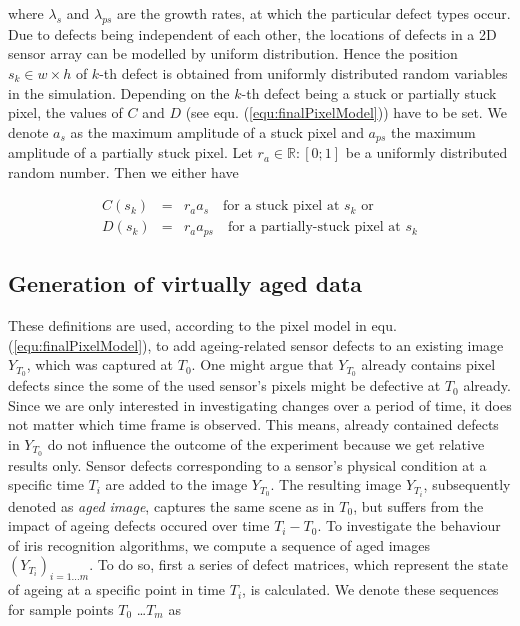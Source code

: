 \documentclass[10pt,twocolumn,letterpaper]{article}
\begin{document}
where $\lambda_s$ and $\lambda_{ps}$ are the growth rates, at which the particular defect types occur. Due to defects being independent of each other, the locations of defects in a 2D sensor array can be modelled by uniform distribution. Hence the position  $s_k \in {w \times h}$ of $k$-th defect is obtained from uniformly distributed random variables in the simulation. Depending on the $k$-th defect being a stuck or partially stuck pixel, the values of $C$ and $D$ (see equ. (\ref{equ:finalPixelModel})) have to be set. We denote $a_s$ as the maximum amplitude of a stuck pixel and $a_{ps}$ the maximum amplitude of a partially stuck pixel. Let $r_a \in \mathbb{R}:[0;1]$ be a uniformly distributed random number. Then we either have

\begin{eqnarray}
   C({s_k})  & = & r_a  a_s \quad \text{for a stuck pixel at } s_k \text{ or} \label{equ:stucks} \\
   D({s_k}) & = &  r_a a_{ps} \quad \text{for a partially-stuck pixel at } s_k \label{equ:partiallyStuck}
\end{eqnarray}


\subsection{Generation of virtually aged data}
These definitions are used, according to the pixel model in equ. (\ref{equ:finalPixelModel}), to add ageing-related sensor defects to an existing image $Y_{T_0}$, which was captured at ${T_0}$. One might argue that $Y_{T_0}$ already contains pixel defects since the some of the used sensor's pixels might be defective at $T_0$ already. Since we are only interested in investigating changes over a period of time, it does not matter which time frame is observed. This means, already contained defects in $Y_{T_0}$ do not influence the outcome of the experiment because we get relative results only. Sensor defects corresponding to a sensor's physical condition at a specific time $T_i$ are added to the image $Y_{T_0}$. The resulting image $Y_{T_i}$, subsequently denoted as \emph{aged image}, captures the same scene as in $T_0$, but suffers from the impact of ageing defects occured over time ${T_i} - {T_0}$. To investigate the behaviour of iris recognition algorithms, we compute a sequence of aged images $(Y_{T_i})_{i=1 \dots m}$. To do so, first a series of defect matrices, which represent the state of ageing at a specific point in time $T_i$, is calculated. We denote these sequences for sample points $T_0$ \dots $T_m$ as
\end{document}
